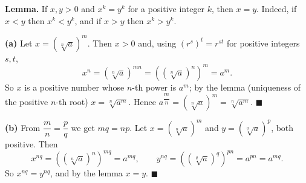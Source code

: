 \textbf{Lemma.} If $x,y>0$ and $x^k=y^k$ for a positive integer $k$, then $x=y$. Indeed, if $x<y$ then $x^k<y^k$, and if $x>y$ then $x^k>y^k$.

\textbf{(a)} Let $x=\left(\sqrt[n]{a}\right)^m$. Then $x>0$ and, using $(r^s)^t=r^{st}$ for positive integers $s,t$,
\[x^n=\left(\sqrt[n]{a}\right)^{mn}=\left(\left(\sqrt[n]{a}\right)^n\right)^m=a^m .\]
So $x$ is a positive number whose $n$-th power is $a^m$; by the lemma (uniqueness of the positive $n$-th root) $x=\sqrt[n]{a^m}$. Hence $a^{\dfrac mn}=\left(\sqrt[n]{a}\right)^m=\sqrt[n]{a^m}$. $\blacksquare$

\textbf{(b)} From $\dfrac mn=\dfrac pq$ we get $mq=np$. Let $x=\left(\sqrt[n]{a}\right)^m$ and $y=\left(\sqrt[q]{a}\right)^p$, both positive. Then
\[x^{nq}=\left(\left(\sqrt[n]{a}\right)^n\right)^{mq}=a^{mq},\qquad y^{nq}=\left(\left(\sqrt[q]{a}\right)^q\right)^{pn}=a^{pn}=a^{mq}.\]
So $x^{nq}=y^{nq}$, and by the lemma $x=y$. $\blacksquare$
